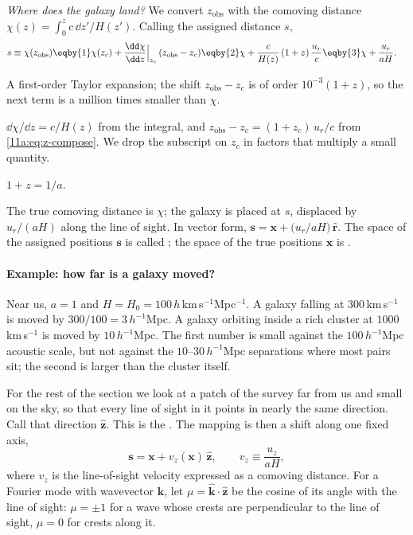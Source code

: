 \emph{Where does the galaxy land?} We convert $z_{\mathrm{obs}}$ with the comoving
distance $\chi(z)=\int_0^z c\,\dd z'/H(z')$. Calling the assigned distance $s$,
\begin{align}
  s\equiv\chi(z_{\mathrm{obs}})
  &\eqby{1}\chi(z_c)+\frac{\dd\chi}{\dd z}\Big|_{z_c}\,(z_{\mathrm{obs}}-z_c)
  \eqby{2}\chi+\frac{c}{H(z)}\,(1+z)\,\frac{u_r}{c}
  \eqby{3}\chi+\frac{u_r}{aH}.
  \label{11a:eq:rsd-map}
\end{align}
\begin{explain}
  \item A first-order Taylor expansion; the shift $z_{\mathrm{obs}}-z_c$ is of
        order $10^{-3}(1+z)$, so the next term is a million times smaller than
        $\chi$.
  \item $\dd\chi/\dd z=c/H(z)$ from the integral, and
        $z_{\mathrm{obs}}-z_c=(1+z_c)\,u_r/c$ from \eqref{11a:eq:z-compose}. We
        drop the subscript on $z_c$ in factors that multiply a small quantity.
  \item $1+z=1/a$.
\end{explain}
The true comoving distance is $\chi$; the galaxy is placed at $s$, displaced by
$u_r/(aH)$ along the line of sight. In vector form,
$\bm s=\bm x+\bigl(u_r/aH\bigr)\,\hat{\bm r}$. The space of the assigned positions
$\bm s$ is called ; the space of the true positions
$\bm x$ is .

\paragraph{Example: how far is a galaxy moved?}
Near us, $a=1$ and $H=H_0=100\,h$\,km\,s$^{-1}$Mpc$^{-1}$. A galaxy falling at
$300$\,km\,s$^{-1}$ is moved by $300/100=3\,h^{-1}$Mpc. A galaxy orbiting inside a
rich cluster at $1000$\,km\,s$^{-1}$ is moved by $10\,h^{-1}$Mpc. The first number
is small against the $100\,h^{-1}$Mpc acoustic scale, but not against the
$10$--$30\,h^{-1}$Mpc separations where most pairs sit; the second is larger
than the cluster itself.

For the rest of the section we look at a patch of the survey far from us and
small on the sky, so that every line of sight in it points in nearly the same
direction. Call that direction $\hat{\bm z}$. This is the
. The mapping is then a shift along one
fixed axis,
\begin{equation}
  \bm s=\bm x+v_z(\bm x)\,\hat{\bm z},\qquad v_z\equiv\frac{u_z}{aH},
  \label{11a:eq:rsd-map-pp}
\end{equation}
where $v_z$ is the line-of-sight velocity expressed as a comoving distance. For a
Fourier mode with wavevector $\bm k$, let $\mu=\hat{\bm k}\cdot\hat{\bm z}$ be the
cosine of its angle with the line of sight: $\mu=\pm1$ for a wave whose crests
are perpendicular to the line of sight, $\mu=0$ for crests along it.


